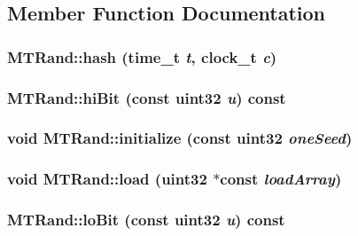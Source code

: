 \subsection{Member Function Documentation}
\hypertarget{classMTRand_a486885d03f38c844315d002e6312fa23}{
\subsubsection[{hash}]{ MTRand::hash (time\_\-t {\em t}, \/  clock\_\-t {\em c})}}
\label{classMTRand_a486885d03f38c844315d002e6312fa23}
\hypertarget{classMTRand_a45eea926a0602e4bb5c0b90b04779826}{
\subsubsection[{hiBit}]{ MTRand::hiBit (const {\bf uint32} {\em u}) const}}
\label{classMTRand_a45eea926a0602e4bb5c0b90b04779826}
\hypertarget{classMTRand_a9b9a20998f5c805af6301ce5c37dcfc3}{
\subsubsection[{initialize}]{\setlength{\rightskip}{0pt plus 5cm}void MTRand::initialize (const {\bf uint32} {\em oneSeed})}}
\label{classMTRand_a9b9a20998f5c805af6301ce5c37dcfc3}
\hypertarget{classMTRand_a8302e9a8cd16d8dfc536a85bf2f68be0}{
\subsubsection[{load}]{\setlength{\rightskip}{0pt plus 5cm}void MTRand::load ({\bf uint32} $\ast$const  {\em loadArray})}}
\label{classMTRand_a8302e9a8cd16d8dfc536a85bf2f68be0}
\hypertarget{classMTRand_a6f5a4a532e1c3acd42052046594205be}{
\subsubsection[{loBit}]{ MTRand::loBit (const {\bf uint32} {\em u}) const}}
